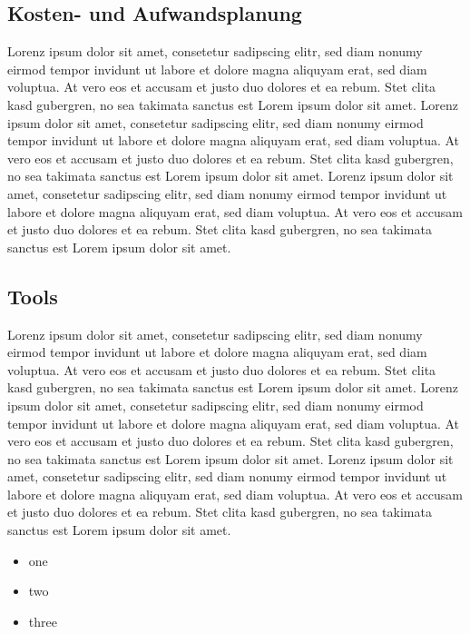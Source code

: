 \subsection{Kosten- und Aufwandsplanung}\label{subsec:Kosten-Aufwandsplanung}
Lorenz ipsum dolor sit amet, consetetur sadipscing elitr, sed diam nonumy eirmod tempor invidunt ut labore et dolore magna aliquyam erat, sed diam voluptua.
At vero eos et accusam et justo duo dolores et ea rebum.
Stet clita kasd gubergren, no sea takimata sanctus est Lorem ipsum dolor sit amet.
Lorenz ipsum dolor sit amet, consetetur sadipscing elitr, sed diam nonumy eirmod tempor invidunt ut labore et dolore magna aliquyam erat, sed diam voluptua.
At vero eos et accusam et justo duo dolores et ea rebum.
Stet clita kasd gubergren, no sea takimata sanctus est Lorem ipsum dolor sit amet.
Lorenz ipsum dolor sit amet, consetetur sadipscing elitr, sed diam nonumy eirmod tempor invidunt ut labore et dolore magna aliquyam erat, sed diam voluptua.
At vero eos et accusam et justo duo dolores et ea rebum.
Stet clita kasd gubergren, no sea takimata sanctus est Lorem ipsum dolor sit amet.

\subsection{Tools}\label{subsec:Tools}
Lorenz ipsum dolor sit amet, consetetur sadipscing elitr, sed diam nonumy eirmod tempor invidunt ut labore et dolore magna aliquyam erat, sed diam voluptua.
At vero eos et accusam et justo duo dolores et ea rebum.
Stet clita kasd gubergren, no sea takimata sanctus est Lorem ipsum dolor sit amet.
Lorenz ipsum dolor sit amet, consetetur sadipscing elitr, sed diam nonumy eirmod tempor invidunt ut labore et dolore magna aliquyam erat, sed diam voluptua.
At vero eos et accusam et justo duo dolores et ea rebum.
Stet clita kasd gubergren, no sea takimata sanctus est Lorem ipsum dolor sit amet.
Lorenz ipsum dolor sit amet, consetetur sadipscing elitr, sed diam nonumy eirmod tempor invidunt ut labore et dolore magna aliquyam erat, sed diam voluptua.
At vero eos et accusam et justo duo dolores et ea rebum.
Stet clita kasd gubergren, no sea takimata sanctus est Lorem ipsum dolor sit amet.

\begin{itemize}
\item one
\item two
\item three
\end{itemize}

